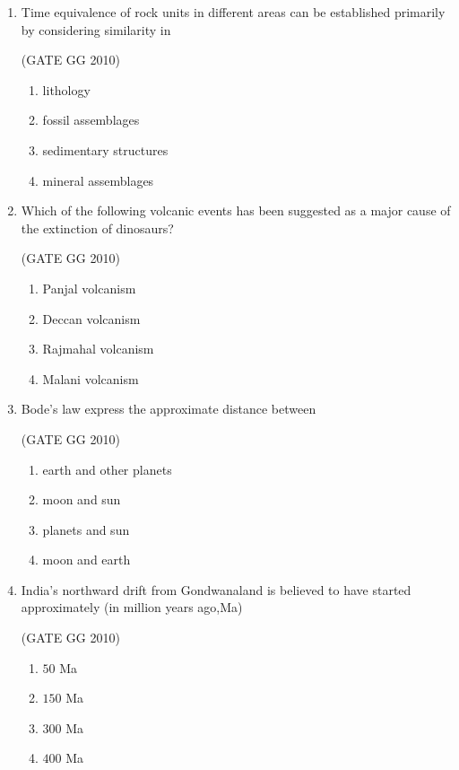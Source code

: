 \documentclass[journal]{IEEEtran}
\begin{document}
\begin{enumerate}
\item  Time equivalence of rock units in different areas  can be established primarily by considering similarity in

\hfill (GATE GG 2010)
\begin{multicols}{4}

\begin{enumerate}
\item lithology
\item fossil assemblages
\item sedimentary structures
\item mineral assemblages
\end{enumerate}
\end{multicols}


\item  Which of the following volcanic events has been suggested as a major cause of the extinction of dinosaurs?

\hfill (GATE GG 2010) 
\begin{multicols}{2}

\begin{enumerate}
\item Panjal volcanism
\item Deccan volcanism
\item Rajmahal volcanism
\item Malani volcanism
\end{enumerate}
\end{multicols}

\item Bode's law express the approximate distance between

\hfill (GATE GG 2010) 

\begin{enumerate}
\item earth and other planets
\item moon and sun
\item planets and sun
\item moon and earth
\end{enumerate}

\item  India's northward drift from Gondwanaland is believed to have started approximately (in million years ago,Ma) 

\hspace*{15.7cm}(GATE GG 2010)
\begin{multicols}{4}
\begin{enumerate}
\item $50$ Ma
\item $150$ Ma
\item $300$ Ma
\item $400$ Ma
\end{enumerate}
\end{multicols}


\end{enumerate}
\end{document}
